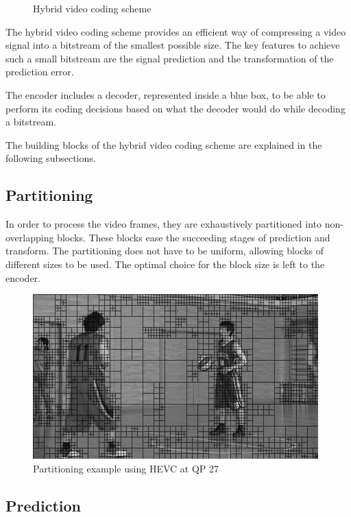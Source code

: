 \documentclass[11pt,a4paper,openright,twoside]{book}
\numberwithin{equation}{section} %
\numberwithin{figure}{section} %
\numberwithin{table}{section} %
\begin{document}
\begin{figure}[tb]
	\centering
	
	\caption{Hybrid video coding scheme}
	\label{fig:hybrid_video_coding_scheme}
\end{figure}

The hybrid video coding scheme provides an efficient way of compressing
a video signal into a bitstream of the smallest possible size.
The key features to achieve such a small bitstream are the signal
prediction and the transformation of the prediction error.

The encoder includes a decoder, represented inside a blue box, to be
able to perform its coding decisions based on what the decoder would do
while decoding a bitstream.

The building blocks of the hybrid video coding scheme are explained in
the following subsections.

\subsection{Partitioning}
\label{sub:partitioning}

In order to process the video frames, they are exhaustively partitioned
into non-overlapping blocks.
These blocks ease the succeeding stages of prediction and transform.
The partitioning does not have to be uniform, allowing blocks of different
sizes to be used.
The optimal choice for the block size is left to the encoder.

\begin{figure}[tb]
	\centering
	\includegraphics[width=0.6\linewidth]{./figures/partitioning-orig-all-001.png}
	\caption{Partitioning example using \acs{HEVC} at \acs{QP} 27}
	\label{fig:partitioning}
\end{figure}

\subsection{Prediction}
\label{sub:prediction}
\end{document}
